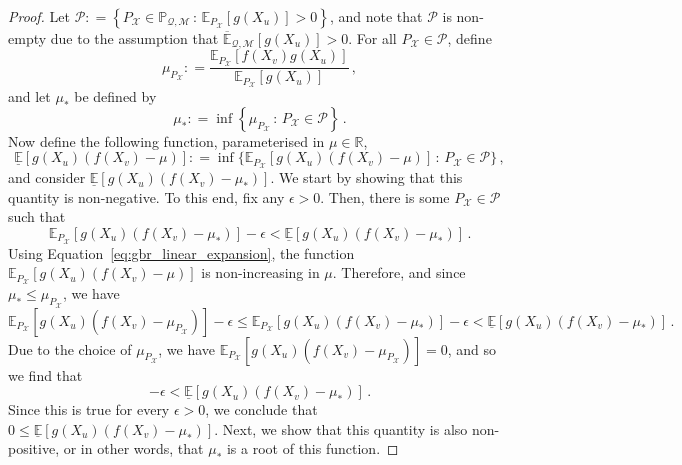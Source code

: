 \documentclass[twoside,11pt]{article}
\newcommand{\reals}{\mathbb{R}}
\newcommand{\states}{\mathcal{X}}
\newcommand{\uexp}{\overline{\mathbb{E}}_{\rateset,\mathcal{M}}}
\newcommand{\rateset}{\mathcal{Q}}
\newcommand{\coloneqq}{:\!=}
\begin{document}
\begin{proof}
Let $\mathcal{P}\coloneqq \left\{ {P_\states}\in\mathbb{P}_{\rateset,\mathcal{M}}\,:\, \mathbb{E}_{P_\states}[g(X_u)] > 0\right\}$, and note that $\mathcal{P}$ is non-empty due to the assumption that $\uexp[g(X_u)]>0$. For all ${P_\states}\in\mathcal{P}$, define
\begin{equation*}
\mu_{P_\states} \coloneqq \frac{\mathbb{E}_{P_\states}[f(X_v)g(X_u)]}{\mathbb{E}_{P_\states}[g(X_u)]}\,,
\end{equation*}
and let $\mu_*$ be defined by
\begin{equation*}
\mu_* \coloneqq \inf\left\{\mu_{P_\states}\,:\,{P_\states}\in\mathcal{P} \right\}\,.
\end{equation*}
Now define the following function, parameterised in $\mu\in\reals$,
\begin{equation*}
\underline{\mathbb{E}}[g(X_u)(f(X_v) - \mu)] \coloneqq \inf\{\mathbb{E}_{P_\states}[g(X_u)(f(X_v) - \mu)]\,:\,{P_\states}\in\mathcal{P} \}\,,
\end{equation*}
and consider $\underline{\mathbb{E}}[g(X_u)(f(X_v) - \mu_*)]$. We start by showing that this quantity is non-negative. To this end, fix any $\epsilon>0$. Then, there is some ${P_\states}\in\mathcal{P}$ such that
\begin{equation*}
\mathbb{E}_{P_\states}[g(X_u)(f(X_v) - \mu_*)] - \epsilon < \underline{\mathbb{E}}[g(X_u)(f(X_v) - \mu_*)]\,.
\end{equation*}
Using Equation~\eqref{eq:gbr_linear_expansion}, the function $\mathbb{E}_{P_\states}[g(X_u)(f(X_v) - \mu)]$ is non-increasing in $\mu$. Therefore, and since $\mu_*\leq \mu_{P_\states}$, we have
\begin{equation*}
\mathbb{E}_{P_\states}[g(X_u)(f(X_v) - \mu_{P_\states})] - \epsilon \leq \mathbb{E}_{P_\states}[g(X_u)(f(X_v) - \mu_*)] - \epsilon < \underline{\mathbb{E}}[g(X_u)(f(X_v) - \mu_*)]\,.
\end{equation*}
Due to the choice of $\mu_{P_\states}$, we have $\mathbb{E}_{P_\states}[g(X_u)(f(X_v) - \mu_{P_\states})]=0$, and so we find that
\begin{equation*}
-\epsilon < \underline{\mathbb{E}}[g(X_u)(f(X_v) - \mu_*)]\,.
\end{equation*}
Since this is true for every $\epsilon>0$, we conclude that $0\leq \underline{\mathbb{E}}[g(X_u)(f(X_v) - \mu_*)]$. Next, we show that this quantity is also non-positive, or in other words, that $\mu_*$ is a root of this function. 


\end{proof}
\end{document}
